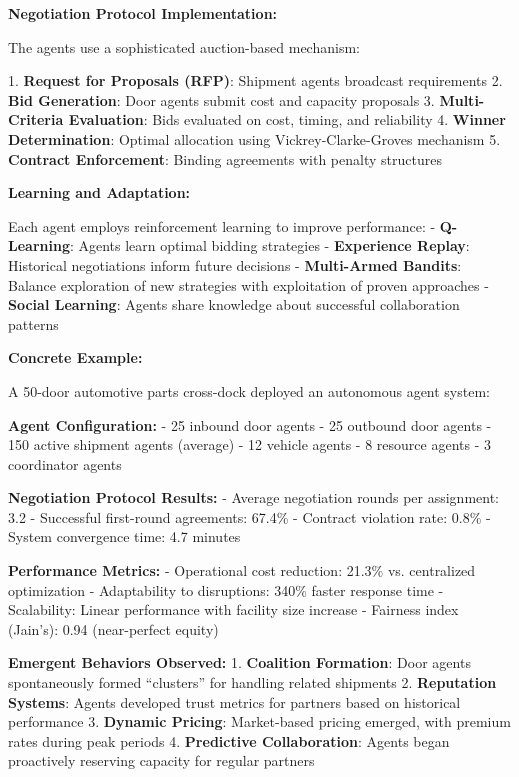 \documentclass{article}
\begin{document}
\textbf{Negotiation Protocol Implementation:}

The agents use a sophisticated auction-based mechanism:

1. \textbf{Request for Proposals (RFP)}: Shipment agents broadcast requirements
2. \textbf{Bid Generation}: Door agents submit cost and capacity proposals
3. \textbf{Multi-Criteria Evaluation}: Bids evaluated on cost, timing, and reliability
4. \textbf{Winner Determination}: Optimal allocation using Vickrey-Clarke-Groves mechanism
5. \textbf{Contract Enforcement}: Binding agreements with penalty structures

\textbf{Learning and Adaptation:}

Each agent employs reinforcement learning to improve performance:
- \textbf{Q-Learning}: Agents learn optimal bidding strategies
- \textbf{Experience Replay}: Historical negotiations inform future decisions
- \textbf{Multi-Armed Bandits}: Balance exploration of new strategies with exploitation of proven approaches
- \textbf{Social Learning}: Agents share knowledge about successful collaboration patterns

\textbf{Concrete Example:}

A 50-door automotive parts cross-dock deployed an autonomous agent system:

\textbf{Agent Configuration:}
- 25 inbound door agents
- 25 outbound door agents  
- 150 active shipment agents (average)
- 12 vehicle agents
- 8 resource agents
- 3 coordinator agents

\textbf{Negotiation Protocol Results:}
- Average negotiation rounds per assignment: 3.2
- Successful first-round agreements: 67.4\%
- Contract violation rate: 0.8\%
- System convergence time: 4.7 minutes

\textbf{Performance Metrics:}
- Operational cost reduction: 21.3\% vs. centralized optimization
- Adaptability to disruptions: 340\% faster response time
- Scalability: Linear performance with facility size increase
- Fairness index (Jain's): 0.94 (near-perfect equity)

\textbf{Emergent Behaviors Observed:}
1. \textbf{Coalition Formation}: Door agents spontaneously formed ``clusters'' for handling related shipments
2. \textbf{Reputation Systems}: Agents developed trust metrics for partners based on historical performance
3. \textbf{Dynamic Pricing}: Market-based pricing emerged, with premium rates during peak periods
4. \textbf{Predictive Collaboration}: Agents began proactively reserving capacity for regular partners
\end{document}
